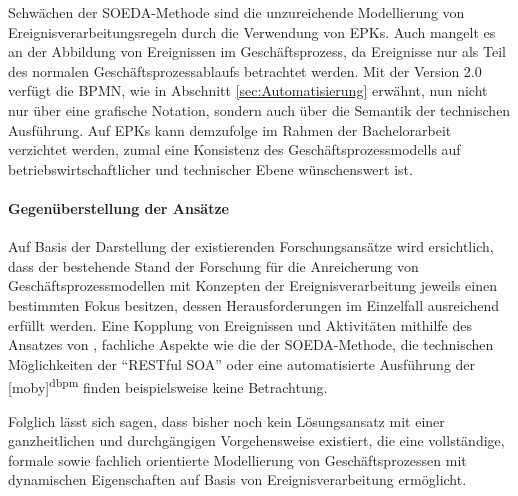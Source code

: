Schwächen der SOEDA-Methode sind die unzureichende Modellierung von Ereignisverarbeitungsregeln durch die Verwendung von \ac{EPK}s. 
\cite{RobraBissantz.2009}
Auch mangelt es an der Abbildung von Ereignissen im Geschäftsprozess, da Ereignisse nur als Teil des normalen Geschäftsprozessablaufs betrachtet werden. Mit der Version 2.0 verfügt die \ac{BPMN}, wie in Abschnitt \ref{sec:Automatisierung} erwähnt, nun nicht nur über eine grafische Notation, sondern auch über die Semantik der technischen Ausführung. Auf \ac{EPK}s kann demzufolge im Rahmen der Bachelorarbeit verzichtet werden, zumal eine Konsistenz des Geschäftsprozessmodells auf betriebswirtschaftlicher und technischer Ebene wünschenswert ist.

\paragraph{Gegenüberstellung der Ansätze}
Auf Basis der Darstellung der existierenden Forschungsansätze wird ersichtlich, dass der bestehende Stand der Forschung für die Anreicherung von Geschäftsprozessmodellen mit Konzepten der Ereignisverarbeitung jeweils einen bestimmten Fokus besitzen, dessen Herausforderungen im Einzelfall ausreichend erfüllt werden. 
Eine Kopplung von Ereignissen und Aktivitäten mithilfe des Ansatzes von \citeauthor{Alexopoulou.2008}, fachliche Aspekte wie die der SOEDA-Methode, die technischen Möglichkeiten der \enquote{RESTful SOA} oder eine automatisierte Ausführung der [moby]\textsuperscript{dbpm} finden beispielsweise keine Betrachtung. 

Folglich lässt sich sagen, dass bisher noch kein Lösungsansatz mit einer ganzheitlichen und durchgängigen Vorgehensweise existiert, die eine vollständige, formale sowie fachlich orientierte Modellierung von Geschäftsprozessen mit dynamischen Eigenschaften auf Basis von Ereignisverarbeitung ermöglicht.

